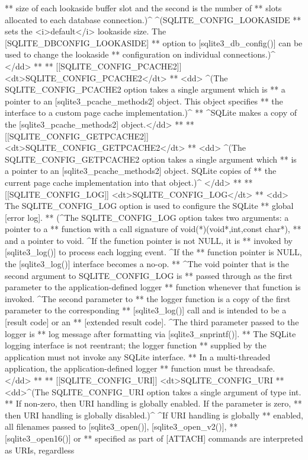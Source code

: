 \begin{Codex}[label=sqlite3.h,numbers=left]
{** size of each lookaside buffer slot and the second is the number of
** slots allocated to each database connection.)^  ^(SQLITE_CONFIG_LOOKASIDE
** sets the <i>default</i> lookaside size. The [SQLITE_DBCONFIG_LOOKASIDE]
** option to [sqlite3_db_config()] can be used to change the lookaside
** configuration on individual connections.)^ </dd>
**
** [[SQLITE_CONFIG_PCACHE2]] <dt>SQLITE_CONFIG_PCACHE2</dt>
** <dd> ^(The SQLITE_CONFIG_PCACHE2 option takes a single argument which is 
** a pointer to an [sqlite3_pcache_methods2] object.  This object specifies
** the interface to a custom page cache implementation.)^
** ^SQLite makes a copy of the [sqlite3_pcache_methods2] object.</dd>
**
** [[SQLITE_CONFIG_GETPCACHE2]] <dt>SQLITE_CONFIG_GETPCACHE2</dt>
** <dd> ^(The SQLITE_CONFIG_GETPCACHE2 option takes a single argument which
** is a pointer to an [sqlite3_pcache_methods2] object.  SQLite copies of
** the current page cache implementation into that object.)^ </dd>
**
** [[SQLITE_CONFIG_LOG]] <dt>SQLITE_CONFIG_LOG</dt>
** <dd> The SQLITE_CONFIG_LOG option is used to configure the SQLite
** global [error log].
** (^The SQLITE_CONFIG_LOG option takes two arguments: a pointer to a
** function with a call signature of void(*)(void*,int,const char*), 
** and a pointer to void. ^If the function pointer is not NULL, it is
** invoked by [sqlite3_log()] to process each logging event.  ^If the
** function pointer is NULL, the [sqlite3_log()] interface becomes a no-op.
** ^The void pointer that is the second argument to SQLITE_CONFIG_LOG is
** passed through as the first parameter to the application-defined logger
** function whenever that function is invoked.  ^The second parameter to
** the logger function is a copy of the first parameter to the corresponding
** [sqlite3_log()] call and is intended to be a [result code] or an
** [extended result code].  ^The third parameter passed to the logger is
** log message after formatting via [sqlite3_snprintf()].
** The SQLite logging interface is not reentrant; the logger function
** supplied by the application must not invoke any SQLite interface.
** In a multi-threaded application, the application-defined logger
** function must be threadsafe. </dd>
**
** [[SQLITE_CONFIG_URI]] <dt>SQLITE_CONFIG_URI
** <dd>^(The SQLITE_CONFIG_URI option takes a single argument of type int.
** If non-zero, then URI handling is globally enabled. If the parameter is zero,
** then URI handling is globally disabled.)^ ^If URI handling is globally
** enabled, all filenames passed to [sqlite3_open()], [sqlite3_open_v2()],
** [sqlite3_open16()] or
** specified as part of [ATTACH] commands are interpreted as URIs, regardless
}
\end{Codex}
